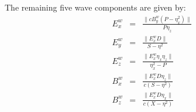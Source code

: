 The remaining five wave components are given by:
\begin{eqnarray}
E_x^w &=& \frac{\|c B_y^w (P - \eta_x^2)\|}{P \eta_z} \\
E_y^w &=& \frac{\|E_x^w D\|}{S - \eta^2} \\
E_z^w &=& \frac{\|E_x^w \eta_x \eta_z\|}{\eta_x^2 - P} \\
B_x^w &=& \frac{\|E_x^w D \eta_z\|}{c (S - \eta^2)} \\
B_z^w &=& \frac{\|E_x^w D \eta_x\|}{c(X - \eta^2)}
\end{eqnarray}

